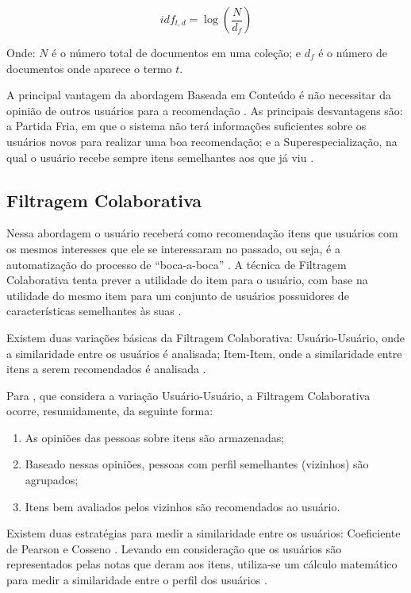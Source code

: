 \begin{equation}
  idf_{t,d} = \log(\frac{N}{d_f})
  \label{eq:idf}
\end{equation}

Onde: $N$ é o número total de documentos em uma coleção; e $d_f$ é o número de documentos onde aparece o termo $t$.

A principal vantagem da abordagem Baseada em Conteúdo é não necessitar da opinião de outros usuários para a recomendação
\cite{ricci2011introduction}. As principais desvantagens são: a Partida Fria, em que o sistema não terá informações
suficientes sobre os usuários novos para realizar uma boa recomendação; e a Superespecialização, na qual o
usuário recebe sempre itens semelhantes aos que já viu \cite{lops2011content}.

\subsection{Filtragem Colaborativa}

Nessa abordagem o usuário receberá como recomendação itens que usuários com os mesmos interesses que ele se
interessaram no passado, ou seja, é a automatização do processo de ``boca-a-boca'' \cite{jannach2010recommender}. A
técnica de Filtragem Colaborativa tenta prever a utilidade  do item para o usuário, com base na utilidade do mesmo
item para um conjunto de usuários  possuidores de características semelhantes às suas \cite{jannach2010recommender}.

Existem duas variações básicas da Filtragem Colaborativa: Usuário-Usuário, onde a similaridade entre os usuários é analisada;
Item-Item, onde a similaridade entre itens a serem recomendados é analisada \cite{jannach2010recommender}.

Para , que considera a variação Usuário-Usuário, a Filtragem Colaborativa ocorre,
resumidamente, da seguinte forma:

\begin{enumerate}
\item As opiniões das pessoas sobre itens são armazenadas;
\item Baseado nessas opiniões, pessoas com perfil semelhantes (vizinhos) são agrupados;
\item Itens bem avaliados pelos vizinhos são recomendados ao usuário.
\end{enumerate}

Existem duas estratégias para medir a similaridade entre os usuários: Coeficiente de Pearson e Cosseno
\cite{torres2004personalizaccao}. Levando em consideração que os usuários são representados pelas notas que deram aos
itens, utiliza-se um cálculo matemático para medir a similaridade entre o perfil dos usuários
\cite{torres2004personalizaccao}.

